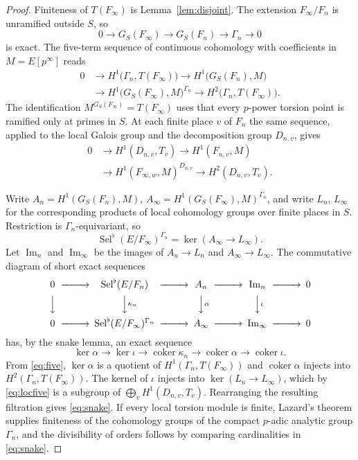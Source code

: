 \documentclass[11pt]{article}
\theoremstyle{definition}
\theoremstyle{remark}
\newcommand{\Sel}{\operatorname{Sel}}
\newcommand{\coker}{\operatorname{coker}}
\newcommand{\flatp}{\flat}
\begin{document}
\begin{proof}
Finiteness of \(T(F_\infty)\) is Lemma~\ref{lem:disjoint}. The extension \(F_\infty/F_n\) is unramified outside \(S\), so
\[
0\to G_S(F_\infty)\to G_S(F_n)\to\Gamma_n\to 0
\]
is exact. The five-term sequence of continuous cohomology with coefficients in \(M=E[p^\infty]\) reads
\begin{equation}
\label{eq:five}
\begin{aligned}
0&\to H^1\bigl(\Gamma_n,T(F_\infty)\bigr)
\to H^1\bigl(G_S(F_n),M\bigr)\\
&\to H^1\bigl(G_S(F_\infty),M\bigr)^{\Gamma_n}
\to H^2\bigl(\Gamma_n,T(F_\infty)\bigr).
\end{aligned}
\end{equation}
The identification \(M^{G_S(F_\infty)}=T(F_\infty)\) uses that every \(p\)-power torsion point is ramified only at primes in \(S\). At each finite place \(v\) of \(F_n\) the same sequence, applied to the local Galois group and the decomposition group \(D_{n,v}\), gives
\begin{equation}
\label{eq:locfive}
\begin{aligned}
0&\to H^1(D_{n,v},T_v)
\to H^1(F_{n,v},M)\\
&\to H^1(F_{\infty,w},M)^{D_{n,v}}
\to H^2(D_{n,v},T_v).
\end{aligned}
\end{equation}

Write \(A_n=H^1(G_S(F_n),M)\), \(A_\infty=H^1(G_S(F_\infty),M)^{\Gamma_n}\), and write \(L_n\), \(L_\infty\) for the corresponding products of local cohomology groups over finite places in \(S\). Restriction is \(\Gamma_n\)-equivariant, so
\[
\Sel^{\flatp}(E/F_\infty)^{\Gamma_n}
=
\ker(A_\infty\to L_\infty).
\]
Let \(\operatorname{Im}_n\) and \(\operatorname{Im}_\infty\) be the images of \(A_n\to L_n\) and \(A_\infty\to L_\infty\). The commutative diagram of short exact sequences
\[
\begin{CD}
0 @>>> \Sel^{\flatp}(E/F_n) @>>> A_n @>>> \operatorname{Im}_n @>>> 0\\
@VVV @VV{\kappa_n}V @VV{\alpha}V @VV{\iota}V\\
0 @>>> \Sel^{\flatp}(E/F_\infty)^{\Gamma_n} @>>> A_\infty @>>> \operatorname{Im}_\infty @>>> 0
\end{CD}
\]
has, by the snake lemma, an exact sequence
\[
\ker\alpha\to\ker\iota\to\coker\kappa_n\to\coker\alpha\to\coker\iota.
\]
From \eqref{eq:five}, \(\ker\alpha\) is a quotient of \(H^1(\Gamma_n,T(F_\infty))\) and \(\coker\alpha\) injects into \(H^2(\Gamma_n,T(F_\infty))\). The kernel of \(\iota\) injects into \(\ker(L_n\to L_\infty)\), which by \eqref{eq:locfive} is a subgroup of \(\bigoplus_v H^1(D_{n,v},T_v)\). Rearranging the resulting filtration gives \eqref{eq:snake}. If every local torsion module is finite, Lazard's theorem supplies finiteness of the cohomology groups of the compact \(p\)-adic analytic group \(\Gamma_n\), and the divisibility of orders follows by comparing cardinalities in \eqref{eq:snake}.
\end{proof}
\end{document}
